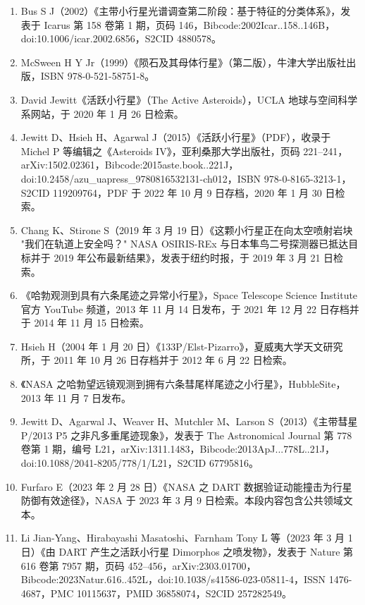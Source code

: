 \begin{enumerate}
\item Bus S J（2002）《主带小行星光谱调查第二阶段：基于特征的分类体系》，发表于 Icarus 第 158 卷第 1 期，页码 146，Bibcode:2002Icar..158..146B，doi:10.1006/icar.2002.6856，S2CID 4880578。
\item McSween H Y Jr（1999）《陨石及其母体行星》（第二版），牛津大学出版社出版，ISBN 978-0-521-58751-8。
\item David Jewitt《活跃小行星》（The Active Asteroids），UCLA 地球与空间科学系网站，于 2020 年 1 月 26 日检索。
\item Jewitt D、Hsieh H、Agarwal J（2015）《活跃小行星》（PDF），收录于 Michel P 等编辑之《Asteroids IV》，亚利桑那大学出版社，页码 221–241，arXiv:1502.02361，Bibcode:2015aste.book..221J，doi:10.2458/azu_uapress_9780816532131-ch012，ISBN 978-0-8165-3213-1，S2CID 119209764，PDF 于 2022 年 10 月 9 日存档，2020 年 1 月 30 日检索。
\item Chang K、Stirone S（2019 年 3 月 19 日）《这颗小行星正在向太空喷射岩块 "我们在轨道上安全吗？" NASA OSIRIS-REx 与日本隼鸟二号探测器已抵达目标并于 2019 年公布最新结果》，发表于纽约时报，于 2019 年 3 月 21 日检索。
\item 《哈勃观测到具有六条尾迹之异常小行星》，Space Telescope Science Institute 官方 YouTube 频道，2013 年 11 月 14 日发布，于 2021 年 12 月 22 日存档并于 2014 年 11 月 15 日检索。
\item Hsieh H（2004 年 1 月 20 日）《133P/Elst-Pizarro》，夏威夷大学天文研究所，于 2011 年 10 月 26 日存档并于 2012 年 6 月 22 日检索。
\item 《NASA 之哈勃望远镜观测到拥有六条彗尾样尾迹之小行星》，HubbleSite，2013 年 11 月 7 日发布。
\item Jewitt D、Agarwal J、Weaver H、Mutchler M、Larson S（2013）《主带彗星 P/2013 P5 之非凡多重尾迹现象》，发表于 The Astronomical Journal 第 778 卷第 1 期，编号 L21，arXiv:1311.1483，Bibcode:2013ApJ...778L..21J，doi:10.1088/2041-8205/778/1/L21，S2CID 67795816。
\item Furfaro E（2023 年 2 月 28 日）《NASA 之 DART 数据验证动能撞击为行星防御有效途径》，NASA 于 2023 年 3 月 9 日检索。本段内容包含公共领域文本。


\item Li Jian-Yang、Hirabayashi Masatoshi、Farnham Tony L 等（2023 年 3 月 1 日）《由 DART 产生之活跃小行星 Dimorphos 之喷发物》，发表于 Nature 第 616 卷第 7957 期，页码 452–456，arXiv:2303.01700，Bibcode:2023Natur.616..452L，doi:10.1038/s41586-023-05811-4，ISSN 1476-4687，PMC 10115637，PMID 36858074，S2CID 257282549。


\end{enumerate}
